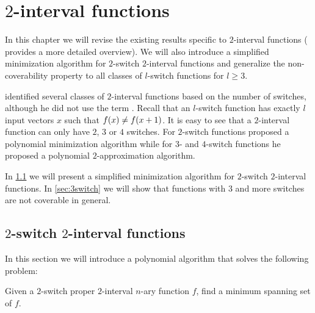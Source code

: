 \chapter{\texorpdfstring{$2$}{2}-interval functions}
\label{chap:2interval}


In this chapter we will revise the existing results specific to
$2$-interval functions
(\citet{Dubovsky2012}
provides a more detailed overview).
We will also introduce a simplified minimization algorithm
for $2$-switch $2$-interval functions
and generalize the non-coverability property to all
classes of $l$-switch functions for $l \geq 3$.

\citeauthor{Dubovsky2012} identified several classes
of $2$-interval functions \citep[p.~5]{Dubovsky2012}
based on the number of switches,
although he did not use the term .
Recall that an $l$-switch function has exactly $l$ input
vectors $x$ such that $f (x) \neq f (x+1)$.
It is easy to see that a $2$-interval function
can only have $2$, $3$ or $4$ switches.
For $2$-switch functions
\citeauthor{Dubovsky2012} proposed
a polynomial minimization algorithm
while for $3$- and $4$-switch functions
he proposed a polynomial $2$-approximation algorithm.


In \cref{sec:2int2switch}
we will present a simplified minimization algorithm
for $2$-switch $2$-interval functions.
In \cref{sec:3switch}
we will show that functions with $3$ and more switches
are not coverable in general.


\section{\texorpdfstring{$2$}{2}-switch
\texorpdfstring{$2$}{2}-interval functions}
\label{sec:2int2switch}

\newcommand{\ftwointtwoswitch}[4]
{#1^{#2}_{\interval{\rep{0}{#2}}{#3},
\interval{#4}{\rep{1}{#2}}}}

\newcommand{\fnba}{\ftwointtwoswitch{f}{n}{b_1}{a_2}}

In this section
we will introduce a polynomial algorithm
that solves the following problem:
\begin{problem}
\label{problem:2switch2intminimization}
Given a $2$-switch
proper
$2$-interval $n$-ary function $f$,
find a minimum spanning set of $f$.
\end{problem}

